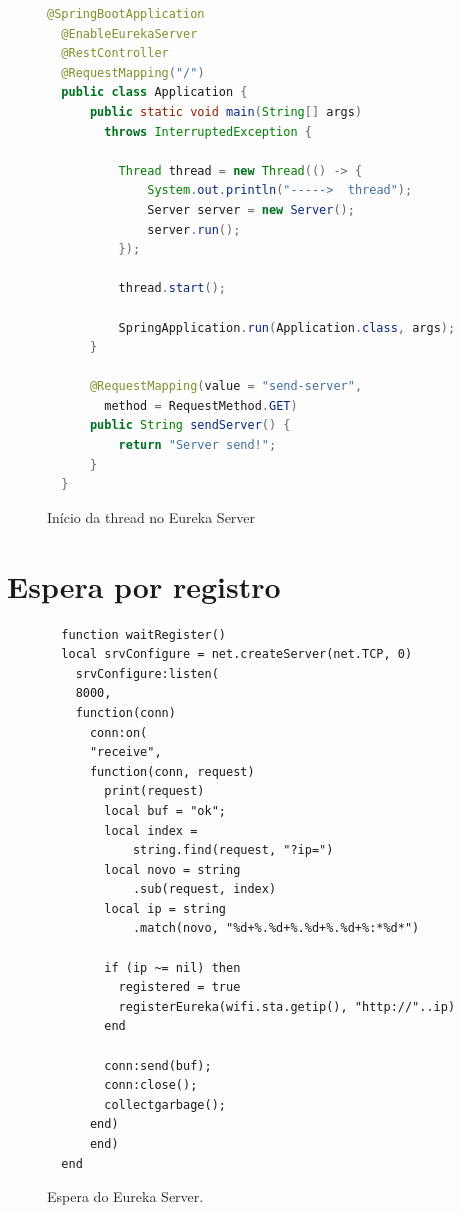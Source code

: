 \documentclass[journal]{IEEEtran}
\begin{document}
\begin{figure}[H]
\centering

\begin{lstlisting}[language=Java]
  @SpringBootApplication
  @EnableEurekaServer
  @RestController
  @RequestMapping("/")
  public class Application {
      public static void main(String[] args) 
        throws InterruptedException {

          Thread thread = new Thread(() -> {
              System.out.println("----->  thread");
              Server server = new Server();
              server.run();
          });

          thread.start();

          SpringApplication.run(Application.class, args);
      }

      @RequestMapping(value = "send-server", 
        method = RequestMethod.GET)
      public String sendServer() {
          return "Server send!";
      }
  }
\end{lstlisting}
\caption{Início da thread no Eureka Server}
\label{broadcasteureka}
\end{figure}

\section{Espera por registro}

\begin{figure}[H]
\centering

\begin{lstlisting}
  function waitRegister()
  local srvConfigure = net.createServer(net.TCP, 0)
    srvConfigure:listen(
    8000,
    function(conn)
      conn:on(
      "receive",
      function(conn, request)
        print(request)
        local buf = "ok";
        local index = 
            string.find(request, "?ip=")
        local novo = string
            .sub(request, index)
        local ip = string
            .match(novo, "%d+%.%d+%.%d+%.%d+%:*%d*")

        if (ip ~= nil) then
          registered = true
          registerEureka(wifi.sta.getip(), "http://"..ip)
        end

        conn:send(buf);
        conn:close();
        collectgarbage();
      end)
      end)
  end
\end{lstlisting}
\caption{Espera do Eureka Server.}
\label{waitRegisterFN}
\end{figure}
\end{document}
